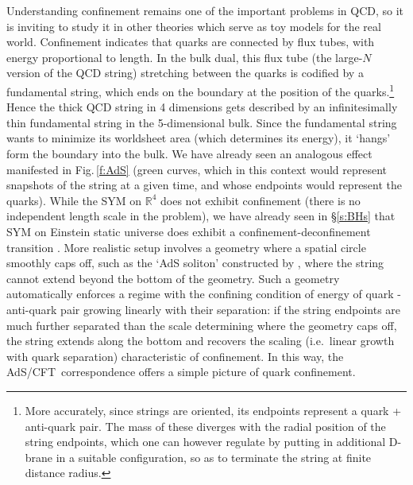 \documentclass[12pt,a4paper]{article}
\def\sect#1{\S\ref{#1}}
\def\fig#1{Fig.\,\ref{#1}}
\def\AC{AdS/CFT}
\def\RR{\mathbb{R}}
\begin{document}
Understanding confinement remains one of the important problems in QCD, so it is inviting to study it in other theories which serve as toy models for the real world.
Confinement indicates that quarks are connected by flux tubes, with energy proportional to length.  In the bulk dual, this flux tube (the large-$N$ version of the QCD string) stretching between the quarks is codified by a fundamental string, which ends on the boundary at the position of the quarks.\footnote{
More accurately, since strings are oriented, its endpoints represent a quark + anti-quark pair.  The mass of these diverges with the radial position of the string endpoints, which one can however regulate by putting in additional D-brane in a suitable configuration, so as to terminate the string at finite distance radius.  
}   Hence the thick QCD string in 4 dimensions gets described by an infinitesimally thin fundamental string in the 5-dimensional bulk.  Since the fundamental string wants to minimize its worldsheet area (which determines its energy), it `hangs' form the boundary into the bulk.  We have already seen an analogous effect manifested in \fig{f:AdS} (green curves, which in this context would represent snapshots of the string at a given time, and whose endpoints would represent the quarks). 
While the SYM on $\RR^4$ does not exhibit confinement (there is no independent length scale in the problem), we have already seen in  \sect{s:BHs} 
that SYM on Einstein static universe does exhibit a confinement-deconfinement transition \cite{Witten:1998zw}.
More realistic setup involves a geometry where a spatial circle smoothly caps off, such as the `AdS soliton' constructed by \cite{Horowitz:1998ha}, where the string cannot extend beyond the bottom of the geometry. 
Such a geometry automatically enforces a regime with the confining condition of energy of quark - anti-quark pair growing linearly with their separation:
 if the string endpoints are much further separated than the scale determining where the geometry caps off, the string extends along the bottom and recovers the scaling (i.e.\ linear growth with quark separation) characteristic of confinement. In this way, the  
\AC\ correspondence  offers a simple picture of quark confinement.  
\end{document}
